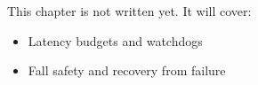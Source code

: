 \label{ch:rc4}
\begin{keyidea}
This chapter is not written yet. It will cover:
\begin{itemize}[nosep]
  \item Latency budgets and watchdogs
  \item Fall safety and recovery from failure
\end{itemize}
\end{keyidea}
